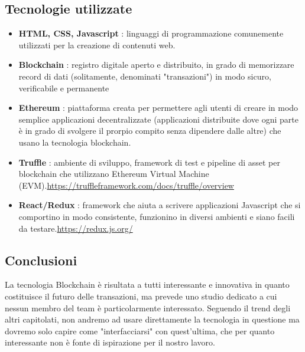 \documentclass{article}
\begin{document}
\subsection{Tecnologie utilizzate}
\begin{itemize}
	\item \textbf{HTML, CSS, Javascript} : linguaggi di programmazione comunemente utilizzati per la creazione di contenuti web.
	\item \textbf{Blockchain} : registro digitale aperto e distribuito, in grado di memorizzare record di dati (solitamente, denominati "transazioni") in modo sicuro, verificabile e permanente
	\item \textbf{Ethereum} : piattaforma creata per permettere agli utenti di creare in modo semplice applicazioni decentralizzate (applicazioni distribuite dove ogni parte è in grado di svolgere il prorpio compito senza dipendere dalle altre) che usano la tecnologia blockchain.
	\item \textbf{Truffle} : ambiente di sviluppo, framework di test e pipeline di asset per blockchain che utilizzano Ethereum Virtual Machine (EVM).\newline \url{https://truffleframework.com/docs/truffle/overview}
	\item \textbf{React/Redux} : framework che aiuta a scrivere applicazioni Javascript che si comportino in modo consistente, funzionino in diversi ambienti e siano facili da testare.\newline \url{https://redux.js.org/}
\end{itemize}
\subsection{Conclusioni}
La tecnologia Blockchain è risultata a tutti interessante e innovativa in quanto costituisce il futuro delle transazioni, ma prevede uno studio dedicato a cui nessun membro del team è particolarmente interessato. Seguendo il trend degli altri capitolati, non andremo ad usare direttamente la tecnologia in questione ma dovremo solo capire come "interfacciarsi" con quest'ultima, che per quanto interessante non è fonte di ispirazione per il nostro lavoro.
\newpage			
									
		
\end{document}
